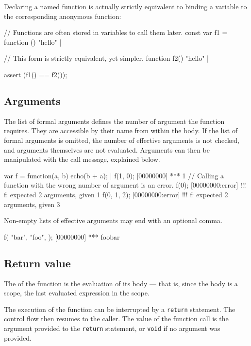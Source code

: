 Declaring a named function is actually strictly equivalent to binding a
variable to the corresponding anonymous function:

\begin{urbiscript}
// Functions are often stored in variables to call them later.
const var f1 = function () { "hello" }|

// This form is strictly equivalent, yet simpler.
function f2() { "hello" }|

assert (f1() == f2());
\end{urbiscript}


\subsection{Arguments}

The list of formal arguments defines the number of argument the function
requires. They are accessible by their name from within the body. If the
list of formal arguments is omitted, the number of effective arguments is
not checked, and arguments themselves are not evaluated. Arguments can then
be manipulated with the call message, explained below.

\begin{urbiscript}
var f = function(a, b) {
  echo(b + a);
}|
f(1, 0);
[00000000] *** 1
// Calling a function with the wrong number of argument is an error.
f(0);
[00000000:error] !!! f: expected 2 arguments, given 1
f(0, 1, 2);
[00000000:error] !!! f: expected 2 arguments, given 3
\end{urbiscript}

Non-empty lists of effective arguments may end with an optional comma.
\begin{urbiscript}
f(
  "bar",
  "foo",
 );
[00000000] *** foobar
\end{urbiscript}


\subsection{Return value}
\label{sec:lang:rv}
The  of the function is the
evaluation of its body --- that is, since the body is a scope, the last
evaluated expression in the scope.

The execution of the function can be interrupted by a \lstinline{return}
statement.  The control flow then resumes to the caller.  The value of the
function call is the argument provided to the \lstinline{return} statement,
or \lstinline{void} if no argument was provided.

